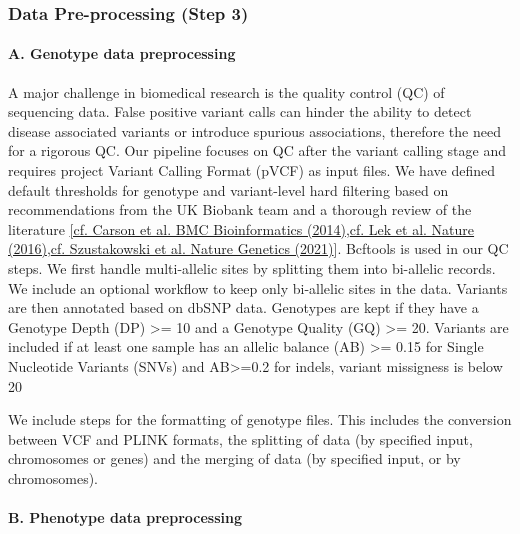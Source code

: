 \documentclass[12pt]{article}
\begin{document}
\subsubsection*{Data Pre-processing (Step 3)}

\paragraph*{A.  Genotype data preprocessing}


A major challenge in biomedical research is the quality control (QC) of sequencing data. False positive variant calls can hinder the ability to detect disease associated variants or introduce spurious associations, therefore the need for a rigorous QC. Our pipeline focuses on QC after the variant calling stage and requires project Variant Calling Format (pVCF) as input files. We have defined default thresholds for genotype and variant-level hard filtering based on recommendations from the UK Biobank team and a thorough review of the literature \href{https://doi.org/10.1186/1471-2105-15-125}{[cf. Carson et al. BMC Bioinformatics (2014)},\href{https://doi.org/10.1038/nature19057}{cf. Lek et al. Nature (2016)},\href{https://doi.org/10.1038/s41588-021-00885-0}{cf. Szustakowski et al. Nature Genetics (2021)}]. Bcftools is used in our QC steps. We first handle multi-allelic sites by splitting them into bi-allelic records. We include an optional workflow to keep only bi-allelic sites in the data. Variants are then annotated based on dbSNP data. Genotypes are kept if they have a Genotype Depth (DP) >= 10 and a Genotype Quality (GQ) >= 20. Variants are included if at least one sample has an allelic balance (AB) >= 0.15 for Single Nucleotide Variants (SNVs) and AB>=0.2 for indels, variant missigness is below 20%

We include steps for the formatting of genotype files. This includes the conversion between VCF and PLINK formats, the splitting of data (by specified input, chromosomes or genes) and the merging of data (by specified input, or by chromosomes).

\paragraph*{B.  Phenotype data preprocessing}
\end{document}
